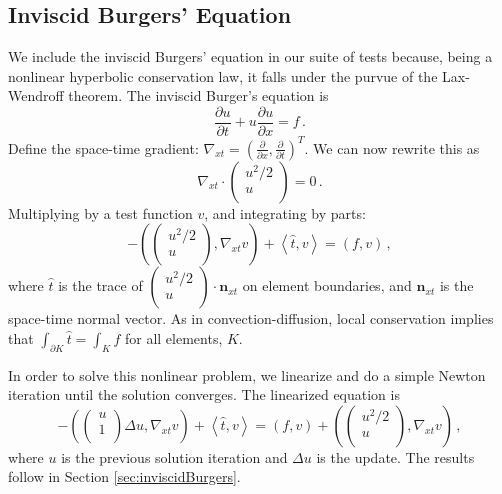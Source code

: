 \documentclass[letterpaper]{article}
\newcommand{\LRp}[1]{\left( #1 \right)}
\newcommand{\LRa}[1]{\left\langle #1 \right\rangle}
\newcommand{\Grad} {\ensuremath{\nabla}}
\def\vecttwo#1#2{\left(
\begin{array}{c}
#1\\
#2\\
\end{array}
\right)}
\begin{document}
\subsection{Inviscid Burgers' Equation}
We include the inviscid Burgers' equation in our suite of tests because, being
a nonlinear hyperbolic conservation law, it
falls under the purvue of the Lax-Wendroff theorem.
The inviscid Burger's equation is
\[
\frac{\partial u}{\partial t}+u\frac{\partial u}{\partial x}=f\,.
\]
Define the space-time gradient: $\Grad_{xt}=\LRp{\frac{\partial}{\partial
x},\frac{\partial}{\partial t}}^T$. We can now rewrite this as
\[
\Grad_{xt}\cdot\vecttwo{u^2/2}{u}=0\,.
\]
Multiplying by a test function $v$, and integrating by parts:
\[
-\LRp{\vecttwo{u^2/2}{u},\Grad_{xt}v}+\LRa{\hat t,v}=\LRp{f,v}\,,
\]
where $\hat t$ is the trace of $\vecttwo{u^2/2}{u}\cdot\mathbf{n}_{xt}$ on
element boundaries, and $\mathbf{n}_{xt}$ is the space-time normal vector.
As in convection-diffusion, local conservation implies that
$\int_{\partial K}\hat t=\int_Kf$ for all elements, $K$.

In order to solve this nonlinear problem, we linearize and do a simple Newton iteration
until the solution converges. The linearized equation is
\[
-\LRp{\vecttwo{u}{1}\Delta u,\Grad_{xt}v}+\LRa{\hat t,v}=\LRp{f,v}
+\LRp{\vecttwo{u^2/2}{u},\Grad_{xt}v} \,,
\]
where $u$ is the previous solution iteration and $\Delta u$ is the update.
The results follow in Section \ref{sec:inviscidBurgers}.
\end{document}
